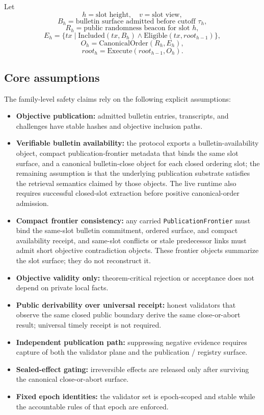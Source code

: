 \documentclass[11pt]{article}
\newcommand{\code}[1]{\texttt{#1}}
\newcommand{\suchthat}{\;|\;}
\begin{document}
Let
\[
h = \text{slot height}, \quad
v = \text{slot view},
\]
\[
B_h = \text{bulletin surface admitted before cutoff }\tau_h,
\]
\[
R_h = \text{public randomness beacon for slot }h,
\]
\[
E_h = \{tx \suchthat \mathrm{Included}(tx, B_h) \wedge \mathrm{Eligible}(tx, root_{h-1})\},
\]
\[
O_h = \mathrm{CanonicalOrder}(R_h, E_h),
\]
\[
root_h = \mathrm{Execute}(root_{h-1}, O_h).
\]

\subsection{Core assumptions}

The family-level safety claims rely on the following explicit assumptions:

\begin{itemize}[leftmargin=1.5em]
\item \textbf{Objective publication:} admitted bulletin entries, transcripts,
and challenges have stable hashes and objective inclusion paths.
\item \textbf{Verifiable bulletin availability:} the protocol exports a
bulletin-availability object, compact publication-frontier metadata that binds
the same slot surface, and a canonical bulletin-close object for each closed
ordering slot; the remaining assumption is that the underlying publication
substrate satisfies the retrieval semantics claimed by those objects. The live
runtime also requires successful closed-slot extraction before positive
canonical-order admission.
\item \textbf{Compact frontier consistency:} any carried
\code{PublicationFrontier} must bind the same-slot bulletin commitment, ordered
surface, and compact availability receipt, and same-slot conflicts or stale
predecessor links must admit short objective contradiction objects. These
frontier objects summarize the slot surface; they do not reconstruct it.
\item \textbf{Objective validity only:} theorem-critical rejection or
acceptance does not depend on private local facts.
\item \textbf{Public derivability over universal receipt:} honest validators
that observe the same closed public boundary derive the same close-or-abort
result; universal timely receipt is not required.
\item \textbf{Independent publication path:} suppressing negative evidence
requires capture of both the validator plane and the publication / registry
surface.
\item \textbf{Sealed-effect gating:} irreversible effects are released only
after surviving the canonical close-or-abort surface.
\item \textbf{Fixed epoch identities:} the validator set is epoch-scoped and
stable while the accountable rules of that epoch are enforced.
\end{itemize}
\end{document}
